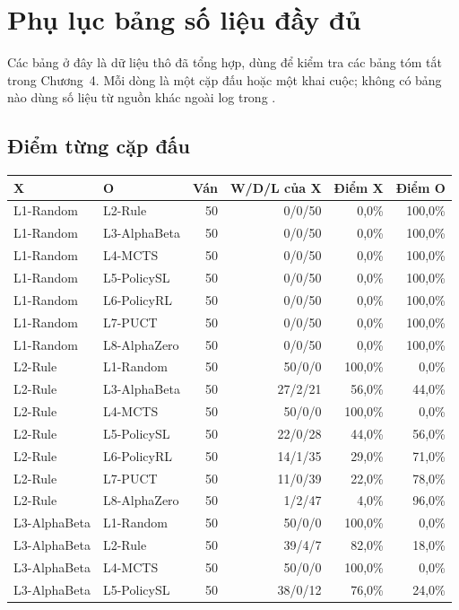 \chapter{Phụ lục bảng số liệu đầy đủ}
\label{app:so-lieu}
Các bảng ở đây là dữ liệu thô đã tổng hợp, dùng để kiểm tra các bảng tóm tắt trong Chương~4. Mỗi dòng là một cặp đấu hoặc một khai cuộc; không có bảng nào dùng số liệu từ nguồn khác ngoài log trong .
\section{Điểm từng cặp đấu}
\begin{small}
\begin{longtable}{@{}llrrrr@{}}
\toprule
X & O & Ván & W/D/L của X & Điểm X & Điểm O \\
\midrule
L1-Random & L2-Rule & 50 & 0/0/50 & 0,0\% & 100,0\% \\
L1-Random & L3-AlphaBeta & 50 & 0/0/50 & 0,0\% & 100,0\% \\
L1-Random & L4-MCTS & 50 & 0/0/50 & 0,0\% & 100,0\% \\
L1-Random & L5-PolicySL & 50 & 0/0/50 & 0,0\% & 100,0\% \\
L1-Random & L6-PolicyRL & 50 & 0/0/50 & 0,0\% & 100,0\% \\
L1-Random & L7-PUCT & 50 & 0/0/50 & 0,0\% & 100,0\% \\
L1-Random & L8-AlphaZero & 50 & 0/0/50 & 0,0\% & 100,0\% \\
L2-Rule & L1-Random & 50 & 50/0/0 & 100,0\% & 0,0\% \\
L2-Rule & L3-AlphaBeta & 50 & 27/2/21 & 56,0\% & 44,0\% \\
L2-Rule & L4-MCTS & 50 & 50/0/0 & 100,0\% & 0,0\% \\
L2-Rule & L5-PolicySL & 50 & 22/0/28 & 44,0\% & 56,0\% \\
L2-Rule & L6-PolicyRL & 50 & 14/1/35 & 29,0\% & 71,0\% \\
L2-Rule & L7-PUCT & 50 & 11/0/39 & 22,0\% & 78,0\% \\
L2-Rule & L8-AlphaZero & 50 & 1/2/47 & 4,0\% & 96,0\% \\
L3-AlphaBeta & L1-Random & 50 & 50/0/0 & 100,0\% & 0,0\% \\
L3-AlphaBeta & L2-Rule & 50 & 39/4/7 & 82,0\% & 18,0\% \\
L3-AlphaBeta & L4-MCTS & 50 & 50/0/0 & 100,0\% & 0,0\% \\
L3-AlphaBeta & L5-PolicySL & 50 & 38/0/12 & 76,0\% & 24,0\% \\

\end{longtable}
\end{small}
